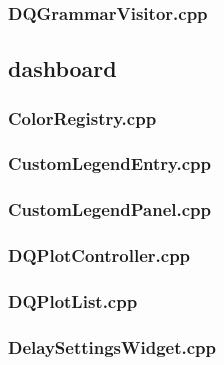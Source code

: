\subsubsection*{DQGrammarVisitor.cpp}


\subsection*{dashboard}

\subsubsection*{ColorRegistry.cpp}


\subsubsection*{CustomLegendEntry.cpp}


\subsubsection*{CustomLegendPanel.cpp}


\subsubsection*{DQPlotController.cpp}


\subsubsection*{DQPlotList.cpp}


\subsubsection*{DelaySettingsWidget.cpp}


